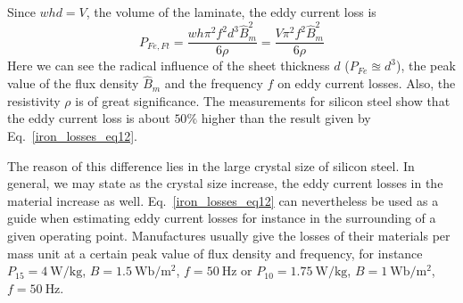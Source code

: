 \documentclass[12pt,a4paper,oneside]{book}
\begin{document}
\begin{onehalfspace}
\begin{equation}
\end{equation}
Since $whd=V$, the volume of the laminate, the eddy current loss is 
\begin{equation}\label{iron_losses_eq12}
	P_{Fe,Ft}=\frac{wh\pi^2f^2d^3\hat{B}_m^2}{6\rho}=\frac{V\pi^2f^2\hat{B}_m^2}{6\rho}
\end{equation}
Here we can see the radical influence of the sheet thickness $d$ ($P_{Fe}\approxeq d^3$), the peak value of the flux density $\hat{B}_m$ and the frequency $f$ on eddy current losses. Also, the resistivity $\rho$ is of great significance. The measurements for silicon steel show that the eddy current loss is about $50\%$ higher than the result given by Eq.~\eqref{iron_losses_eq12}.

The reason of this difference lies in the large crystal size of silicon steel. In general, we may state as the crystal size increase, the eddy current losses in the material increase as well. Eq.~\eqref{iron_losses_eq12} can nevertheless be used as a guide when estimating eddy current losses for instance in the surrounding of a given operating point. Manufactures usually give the losses of their materials per mass unit at a certain peak value of flux density and frequency, for instance $P_{15} = \SI{4}{\watt\per\kilo\gram}$, $B=\SI{1.5}{\weber\per\square\meter}$, $f=\SI{50}{\hertz}$ or $P_{10} = \SI{1.75}{\watt\per\kilo\gram}$, $B=\SI{1}{\weber\per\square\meter}$, $f=\SI{50}{\hertz}$.


\end{onehalfspace}
\end{document}

